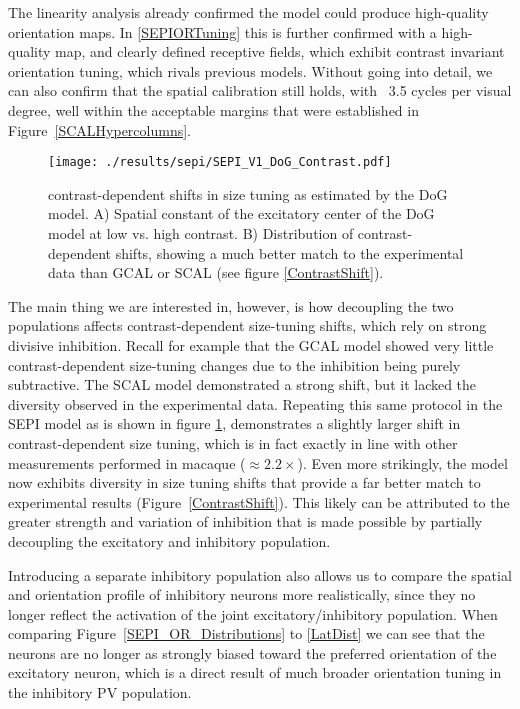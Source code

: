 The linearity analysis already confirmed the model could produce
high-quality orientation maps. In \ref{SEPIORTuning} this is further
confirmed with a high-quality map, and clearly defined receptive
fields, which exhibit contrast invariant orientation tuning, which
rivals previous models. Without going into detail, we can also confirm
that the spatial calibration still holds, with ~3.5 cycles per visual
degree, well within the acceptable margins that were established in
Figure~\ref{SCALHypercolumns}.

\begin{figure}
	\centering
        \texttt{[image: ./results/sepi/SEPI\_V1\_DoG\_Contrast.pdf]}
	\caption{contrast-dependent shifts in size tuning as estimated by
      the DoG model. A) Spatial constant of the excitatory center of
      the DoG model at low vs. high contrast. B) Distribution of
      contrast-dependent shifts, showing a much better match to the
      experimental data than GCAL or SCAL (see figure
      \ref{ContrastShift}).}
	\label{SEPI_DoG_Contrast}
\end{figure}

The main thing we are interested in, however, is how decoupling the
two populations affects contrast-dependent size-tuning shifts, which
rely on strong divisive inhibition. Recall for example that the GCAL
model showed very little contrast-dependent size-tuning changes due to
the inhibition being purely subtractive. The SCAL model demonstrated a
strong shift, but it lacked the diversity observed in the experimental
data. Repeating this same protocol in the SEPI model as is shown in
figure \ref{SEPI_DoG_Contrast}, demonstrates a slightly larger shift
in contrast-dependent size tuning, which is in fact exactly in line
with other measurements performed in macaque ($\approx
2.2\times$). Even more strikingly, the model now exhibits diversity in
size tuning shifts that provide a far better match to experimental
results (Figure~\ref{ContrastShift}). This likely can be attributed to
the greater strength and variation of inhibition that is made possible
by partially decoupling the excitatory and inhibitory population.


Introducing a separate inhibitory population also allows us to compare
the spatial and orientation profile of inhibitory neurons more
realistically, since they no longer reflect the activation of the
joint excitatory/inhibitory population. When comparing
Figure~\ref{SEPI_OR_Distributions} to \ref{LatDist} we can see
that the neurons are no longer as strongly biased toward the preferred
orientation of the excitatory neuron, which is a direct result of much
broader orientation tuning in the inhibitory PV population.

